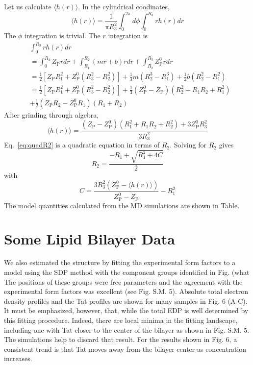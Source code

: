 \documentclass[12pt,letterpaper]{article}
\newcommand{\zp}{Z_\mathrm{P}}
\begin{document}
Let us calculate $\langle h(r) \rangle$. In the cylindrical coodinates, 
\begin{equation}
  \langle h(r) \rangle 
  = \frac{1}{\pi R_3^2} \int_0^{2\pi}d\phi \int_0^{R_3}rh(r)dr
\end{equation}
The $\phi$ integration is trivial. The $r$ integration is
\begin{align}
  & \int_0^{R_3}rh(r)dr \nonumber\\
  &= \int_0^{R_1} \zp rdr + \int_{R_1}^{R_2}(mr+b)rdr + \int_{R_2}^{R_3}\zp^0rdr \nonumber\\
  &= \frac{1}{2}\left[\zp R_1^2+\zp^0(R_3^2-R_2^2)\right] + 
     \frac{1}{3}m\left(R_2^3-R_1^3\right) + 
     \frac{1}{2}b\left(R_2^2-R_1^2\right) \nonumber\\        
  &= \frac{1}{2}\left[\zp R_1^2+\zp^0(R_3^2-R_2^2)\right] +
     \frac{1}{3}\left(\zp^0-\zp\right)\left(R_2^2+R_1R_2+R_1^2\right) \nonumber\\
  &  + \frac{1}{2}\left(\zp R_2-\zp^0 R_1\right)\left(R_1+R_2\right)
\end{align}
After grinding through algebra, 
\begin{equation}
  \langle h(r) \rangle 
  = \frac{\left(\zp-\zp^0\right)\left(R_1^2+R_1R_2+R_2^2\right)+3\zp^0R_3^2}{3R_3^2}
  \label{eq:quadR2}
\end{equation}
Eq.~\ref{eq:quadR2} is a quadratic equation in terms of $R_2$. 
Solving for $R_2$ gives
\begin{equation}
  R_2 = \frac{-R_1+\sqrt{R_1^2+4C}}{2} 
\end{equation}
with
\begin{equation}
  C = \frac{3R_3^2\left(\zp^0-\langle h(r)\rangle\right)}{\zp^0-\zp} - R_1^2
\end{equation}
The model quantities calculated from the MD simulations are shown in Table.

\section{Some Lipid Bilayer Data}
We also estimated the structure by fitting the experimental form factors to a 
model using the SDP method with the component groups identified in Fig. (what  
The positions of 
these groups were free parameters and the agreement with the experimental form 
factors was excellent (see Fig. S.M. 5).  Absolute total electron density 
profiles and the Tat profiles are shown for many samples in Fig. 6 (A-C).  
It must be emphasized, however, that, while the total EDP is well determined by 
this fitting procedure.  Indeed, there are local minima in the fitting landscape, 
including one with Tat closer to the center of the bilayer as shown in Fig. 
S.M. 5.  The simulations help to discard that result. For the results shown in 
Fig. 6, a consistent trend is that Tat moves away from the bilayer center as 
concentration increases. 
\end{document}
